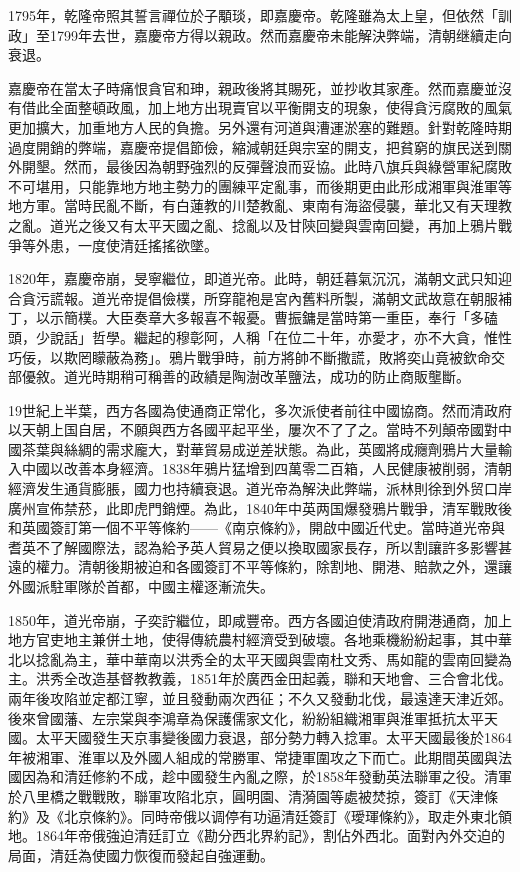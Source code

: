 1795年，乾隆帝照其誓言禪位於子顒琰，即嘉慶帝。乾隆雖為太上皇，但依然「訓政」至1799年去世，嘉慶帝方得以親政。然而嘉慶帝未能解決弊端，清朝继續走向衰退。

嘉慶帝在當太子時痛恨貪官和珅，親政後將其賜死，並抄收其家產。然而嘉慶並沒有借此全面整頓政風，加上地方出現賣官以平衡開支的現象，使得貪污腐敗的風氣更加擴大，加重地方人民的負擔。另外還有河道與漕運淤塞的難題。針對乾隆時期過度開銷的弊端，嘉慶帝提倡節儉，縮減朝廷與宗室的開支，把貧窮的旗民送到關外開墾。然而，最後因為朝野強烈的反彈聲浪而妥協。此時八旗兵與綠營軍紀腐敗不可堪用，只能靠地方地主勢力的團練平定亂事，而後期更由此形成湘軍與淮軍等地方軍。當時民亂不斷，有白蓮教的川楚教亂、東南有海盜侵襲，華北又有天理教之亂。道光之後又有太平天國之亂、捻亂以及甘陝回變與雲南回變，再加上鴉片戰爭等外患，一度使清廷搖搖欲墜。

1820年，嘉慶帝崩，旻寧繼位，即道光帝。此時，朝廷暮氣沉沉，滿朝文武只知迎合貪污謊報。道光帝提倡儉樸，所穿龍袍是宮內舊料所製，滿朝文武故意在朝服補丁，以示簡樸。大臣奏章大多報喜不報憂。曹振鏞是當時第一重臣，奉行「多磕頭，少說話」哲學。繼起的穆彰阿，人稱「在位二十年，亦愛才，亦不大貪，惟性巧佞，以欺罔矇蔽為務」。鴉片戰爭時，前方將帥不斷撒謊，敗將奕山竟被欽命交部優敘。道光時期稍可稱善的政績是陶澍改革鹽法，成功的防止商販壟斷。

19世紀上半葉，西方各國為使通商正常化，多次派使者前往中國協商。然而清政府以天朝上国自居，不願與西方各國平起平坐，屢次不了了之。當時不列顛帝國對中國茶葉與絲綢的需求龐大，對華貿易成逆差狀態。為此，英國將成癮劑鴉片大量輸入中國以改善本身經濟。1838年鴉片猛增到四萬零二百箱，人民健康被削弱，清朝經濟发生通貨膨脹，國力也持續衰退。道光帝為解決此弊端，派林則徐到外贸口岸廣州宣佈禁菸，此即虎門銷煙。為此，1840年中英两国爆發鴉片戰爭，清军戰敗後和英國簽訂第一個不平等條約——《南京條約》，開啟中國近代史。當時道光帝與耆英不了解國際法，認為給予英人貿易之便以換取國家長存，所以割讓許多影響甚遠的權力。清朝後期被迫和各國簽訂不平等條約，除割地、開港、賠款之外，還讓外國派駐軍隊於首都，中國主權逐漸流失。

1850年，道光帝崩，子奕詝繼位，即咸豐帝。西方各國迫使清政府開港通商，加上地方官吏地主兼併土地，使得傳統農村經濟受到破壞。各地乘機紛紛起事，其中華北以捻亂為主，華中華南以洪秀全的太平天國與雲南杜文秀、馬如龍的雲南回變為主。洪秀全改造基督教教義，1851年於廣西金田起義，聯和天地會、三合會北伐。兩年後攻陷並定都江寧，並且發動兩次西征；不久又發動北伐，最遠達天津近郊。後來曾國藩、左宗棠與李鴻章為保護儒家文化，紛紛組織湘軍與淮軍抵抗太平天國。太平天國發生天京事變後國力衰退，部分勢力轉入捻軍。太平天國最後於1864年被湘軍、淮軍以及外國人組成的常勝軍、常捷軍圍攻之下而亡。此期間英國與法國因為和清廷修約不成，趁中國發生內亂之際，於1858年發動英法聯軍之役。清軍於八里橋之戰戰敗，聯軍攻陷北京，圓明園、清漪園等處被焚掠，簽訂《天津條約》及《北京條約》。同時帝俄以调停有功逼清廷簽訂《璦琿條約》，取走外東北領地。1864年帝俄強迫清廷訂立《勘分西北界約記》，割佔外西北。面對內外交迫的局面，清廷為使國力恢復而發起自強運動。

